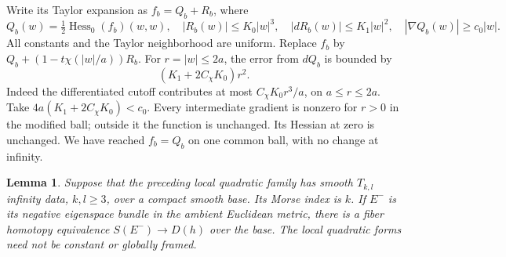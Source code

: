 \documentclass[11pt]{article}
\newtheorem{lemma}[theorem]{Lemma}
\begin{document}
Write its Taylor expansion as \(f_b=Q_b+R_b\), where
\[
 Q_b(w)=\tfrac12\operatorname{Hess}_0(f_b)(w,w),\quad
 |R_b(w)|\leq K_0|w|^3,\quad |dR_b(w)|\leq K_1|w|^2,
 \quad |\nabla Q_b(w)|\geq c_0|w|.
 \tag{2}
\]
All constants and the Taylor neighborhood are uniform.
Replace \(f_b\) by \(Q_b+(1-t\chi(|w|/a))R_b\).
For \(r=|w|\leq2a\), the error from \(dQ_b\) is bounded by
\[
 (K_1+2C_\chi K_0)r^2.
 \tag{3}
\]
Indeed the differentiated cutoff contributes at most
\(C_\chi K_0r^3/a\), on \(a\leq r\leq2a\).
Take \(4a(K_1+2C_\chi K_0)<c_0\).
Every intermediate gradient is nonzero for \(r>0\) in the modified
ball; outside it the function is unchanged.
Its Hessian at zero is unchanged. We have reached \(f_b=Q_b\)
on one common ball, with no change at infinity.

\begin{lemma}\label{lem:sphere}
Suppose that the preceding local quadratic family has smooth
\(T_{k,l}\) infinity data, \(k,l\geq3\), over a compact smooth base.
Its Morse index is \(k\). If \(E^-\) is its negative eigenspace
bundle in the ambient Euclidean metric, there is a fiber homotopy
equivalence \(S(E^-)\longrightarrow D(h)\) over the base.
The local quadratic forms need not be constant or globally framed.
\end{lemma}
\end{document}
